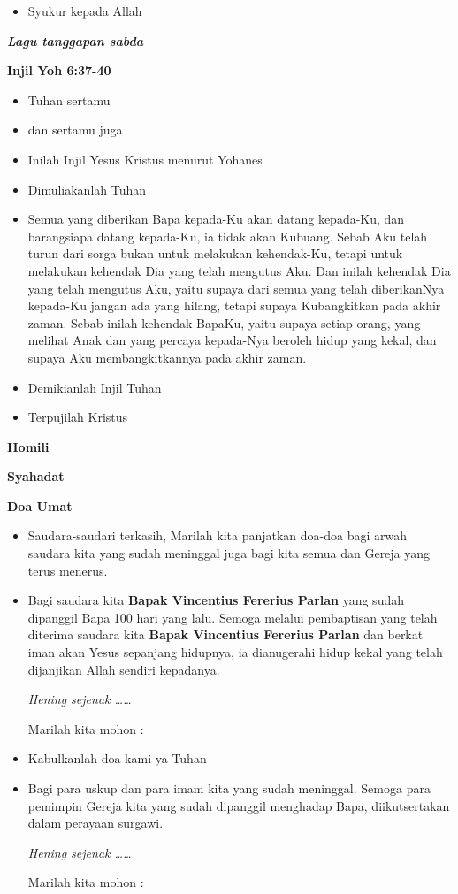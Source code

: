 \documentclass[titlepage,10pt,openany]{scrbook}
\makeatletter
\newcommand{\subjudul}[1]{%
  {\parindent \z@ 
    \interlinepenalty\@M \bfseries #1\par\nobreak \vskip 10\p@ }}
\newcommand{\lagu}[1]{%
  {\parindent \z@ 
    \interlinepenalty\@M \slshape \bfseries \normalsize \textit{#1}\par\nobreak \vskip 10\p@ }}
\newcommand{\BU}[1]{\begin{itemize} \item[U:] #1 \end{itemize}}
\newcommand{\BI}[1]{\begin{itemize} \item[I:] #1 \end{itemize}}
\newcommand{\BP}[1]{\begin{itemize} \item[P:] #1 \end{itemize}}
\newcommand{\namaalm}{Bapak Vincentius Fererius Parlan }
\makeatother
\begin{document}
\BU{Syukur kepada Allah}

 

\lagu{Lagu tanggapan sabda}
 

\subjudul{Injil Yoh 6:37-40}

\BI{Tuhan sertamu}

\BU{dan sertamu juga} 

\BI{Inilah Injil Yesus Kristus menurut Yohanes }

\BU{Dimuliakanlah Tuhan}

\BI{Semua yang diberikan Bapa kepada\hyp Ku akan datang
kepada\hyp Ku, dan barangsiapa datang kepada\hyp Ku, ia tidak akan
Kubuang. Sebab Aku telah turun dari sorga bukan untuk
melakukan kehendak\hyp Ku, tetapi untuk melakukan kehendak Dia
yang telah mengutus Aku. Dan inilah kehendak Dia yang telah
mengutus Aku, yaitu supaya dari semua yang telah
diberikanNya kepada-Ku jangan ada yang hilang, tetapi supaya
Kubangkitkan pada akhir zaman. Sebab inilah kehendak
BapaKu, yaitu supaya setiap orang, yang melihat Anak dan
yang percaya kepada\hyp Nya beroleh hidup yang kekal, dan
supaya Aku membangkitkannya pada akhir zaman.}


\BI{Demikianlah Injil Tuhan}

\BU{Terpujilah Kristus}

 

\subjudul{Homili}

\subjudul{Syahadat} 

\subjudul{Doa Umat}

\BI{Saudara-saudari terkasih,
Marilah kita panjatkan doa-doa bagi arwah saudara kita
yang sudah meninggal juga bagi kita semua dan Gereja
yang terus menerus.}

\BP{Bagi saudara kita \textbf{\namaalm} yang sudah dipanggil Bapa 100
hari yang lalu. Semoga melalui pembaptisan yang telah
diterima saudara kita \textbf{\namaalm} dan berkat iman akan Yesus
sepanjang hidupnya, ia dianugerahi hidup kekal yang
telah dijanjikan Allah sendiri kepadanya.

\textit{Hening sejenak \ldots\ldots} 

Marilah kita mohon :}

\BU{Kabulkanlah doa kami ya Tuhan}

\BP{Bagi para uskup dan para imam kita yang sudah
meninggal.
Semoga para pemimpin Gereja kita yang sudah dipanggil
menghadap Bapa, diikutsertakan dalam perayaan surgawi.

\textit{Hening sejenak \ldots\ldots} 

Marilah kita mohon :}
\end{document}
